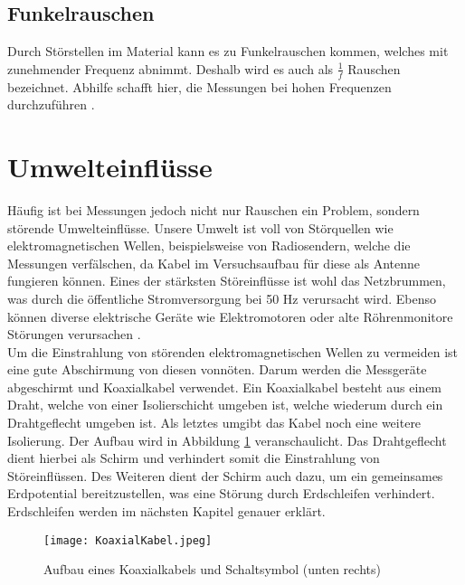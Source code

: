 \subsection{Funkelrauschen}
Durch Störstellen im Material kann es zu Funkelrauschen kommen, welches mit zunehmender Frequenz abnimmt. Deshalb wird es auch als $\frac{1}{f}$ Rauschen bezeichnet. Abhilfe schafft hier, die Messungen bei hohen Frequenzen durchzuführen \citep{VA}.

\newpage
\section{Umwelteinflüsse}
\label{sec:umwelt}
Häufig ist bei Messungen jedoch nicht nur Rauschen ein Problem, sondern störende Umwelteinflüsse. Unsere Umwelt ist voll von Störquellen wie elektromagnetischen Wellen, beispielsweise von Radiosendern, welche die Messungen verfälschen, da Kabel im Versuchsaufbau für diese als Antenne fungieren können. Eines der stärksten Störeinflüsse ist wohl das Netzbrummen, was durch die öffentliche Stromversorgung bei 50 Hz verursacht wird. Ebenso können diverse elektrische Geräte wie Elektromotoren oder alte Röhrenmonitore Störungen verursachen \citep{VA}.\\

Um die Einstrahlung von störenden elektromagnetischen Wellen zu vermeiden ist eine gute Abschirmung von diesen vonnöten.
Darum werden die Messgeräte abgeschirmt und Koaxialkabel verwendet. Ein Koaxialkabel besteht aus einem Draht, welche von einer Isolierschicht umgeben ist, welche wiederum durch ein Drahtgeflecht umgeben ist. Als letztes umgibt das Kabel noch eine weitere Isolierung. Der Aufbau wird in Abbildung \ref{fig:Koaxialkabel} veranschaulicht. Das Drahtgeflecht dient hierbei als Schirm und verhindert somit die Einstrahlung von Störeinflüssen. Des Weiteren dient der Schirm auch dazu, um ein gemeinsames Erdpotential bereitzustellen, was eine Störung durch Erdschleifen verhindert. Erdschleifen werden im nächsten Kapitel genauer erklärt.

\begin{figure}[h]
    \centering
    \texttt{[image: KoaxialKabel.jpeg]}
    \caption{Aufbau eines Koaxialkabels und Schaltsymbol (unten rechts) \citep{VA}}
    \label{fig:Koaxialkabel}
\end{figure}

\newpage
